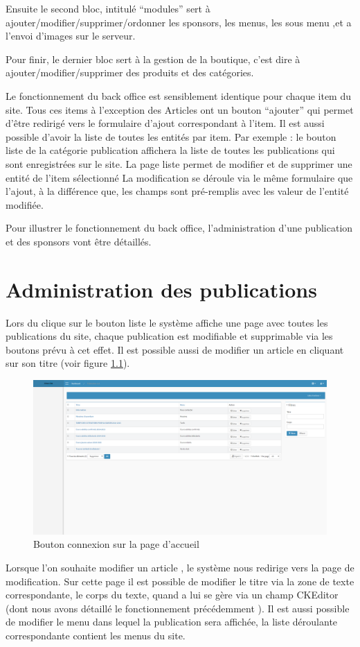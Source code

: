\documentclass[a4paper,12pt, notitlepage]{report}
\begin{document}
Ensuite le second bloc, intitulé “modules” sert à ajouter/modifier/supprimer/ordonner les sponsors, les menus,  les sous menu ,et a l’envoi d’images sur le serveur.

Pour finir, le dernier bloc sert à la gestion de la boutique, c’est dire à ajouter/modifier/supprimer des produits et des catégories.

Le fonctionnement du back office est sensiblement identique pour chaque item du site.
Tous ces items à l’exception des Articles ont un bouton “ajouter” qui permet d'être redirigé vers le formulaire d’ajout correspondant à l’item.
Il est aussi possible d’avoir la liste de toutes les entités par item.
Par exemple :  le bouton liste de la catégorie publication affichera la liste de toutes les publications qui sont enregistrées sur le site.
La page liste permet de modifier et de supprimer une entité de l’item sélectionné
La modification se déroule via le même formulaire que l’ajout, à la différence que, les champs sont pré-remplis avec les valeur de l’entité modifiée.

Pour illustrer le fonctionnement du back office, l’administration d’une publication et des sponsors vont être détaillés.
\chapter{Administration des publications}
Lors du clique sur le bouton liste le système affiche une page avec toutes les publications du site, chaque publication est modifiable et supprimable  via les boutons prévu à cet effet.
Il est possible aussi de modifier un article en cliquant sur son titre (voir figure \ref{liste-publication}).
\begin{figure} 
    \caption{Bouton connexion sur la page d'accueil}  
    \label{liste-publication}
    \centering
    \includegraphics[scale=0.3]{images/liste-publication.png}
\end{figure}
Lorsque l’on souhaite modifier un article , le système nous redirige vers la page de modification.
Sur cette page il est possible de modifier le titre via la zone de texte correspondante,
le corps du texte, quand a lui se gère via un champ CKEditor (dont nous avons détaillé le fonctionnement précédemment ).
Il est aussi possible de modifier le menu dans lequel la publication sera affichée,
la liste déroulante correspondante contient les menus du site. 
\end{document}
